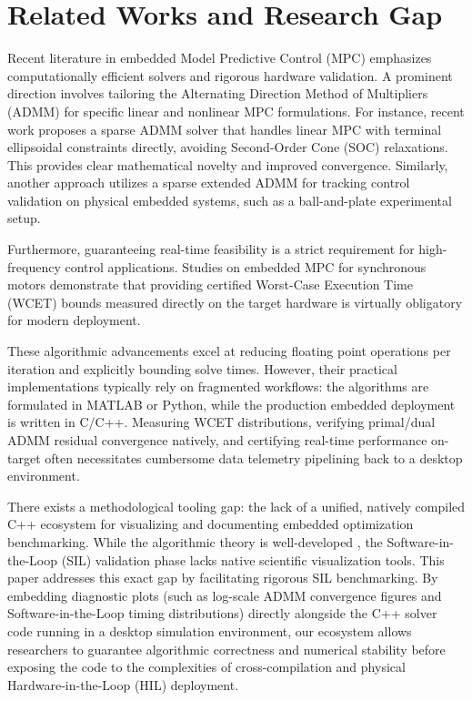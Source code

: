 \documentclass[preprint,12pt]{elsarticle}
\begin{document}
\section{Related Works and Research Gap}
\label{sec:related_works}

Recent literature in embedded Model Predictive Control (MPC) emphasizes computationally efficient solvers and rigorous hardware validation. A prominent direction involves tailoring the Alternating Direction Method of Multipliers (ADMM) for specific linear and nonlinear MPC formulations. For instance, recent work \cite{tcst2024admm} proposes a sparse ADMM solver that handles linear MPC with terminal ellipsoidal constraints directly, avoiding Second-Order Cone (SOC) relaxations. This provides clear mathematical novelty and improved convergence. Similarly, another approach \cite{tcst2021tracking} utilizes a sparse extended ADMM for tracking control validation on physical embedded systems, such as a ball-and-plate experimental setup. 

Furthermore, guaranteeing real-time feasibility is a strict requirement for high-frequency control applications. Studies on embedded MPC for synchronous motors \cite{embedded_wcet} demonstrate that providing certified Worst-Case Execution Time (WCET) bounds measured directly on the target hardware is virtually obligatory for modern deployment. 

These algorithmic advancements excel at reducing floating point operations per iteration and explicitly bounding solve times. However, their practical implementations typically rely on fragmented workflows: the algorithms are formulated in MATLAB or Python, while the production embedded deployment is written in C/C++. Measuring WCET distributions, verifying primal/dual ADMM residual convergence natively, and certifying real-time performance on-target often necessitates cumbersome data telemetry pipelining back to a desktop environment. 

There exists a methodological tooling gap: the lack of a unified, natively compiled C++ ecosystem for visualizing and documenting embedded optimization benchmarking. While the algorithmic theory is well-developed \cite{tcst2024admm, tcst2021tracking}, the Software-in-the-Loop (SIL) validation phase lacks native scientific visualization tools. This paper addresses this exact gap by facilitating rigorous SIL benchmarking. By embedding diagnostic plots (such as log-scale ADMM convergence figures and Software-in-the-Loop timing distributions) directly alongside the C++ solver code running in a desktop simulation environment, our ecosystem allows researchers to guarantee algorithmic correctness and numerical stability before exposing the code to the complexities of cross-compilation and physical Hardware-in-the-Loop (HIL) deployment.
\end{document}
